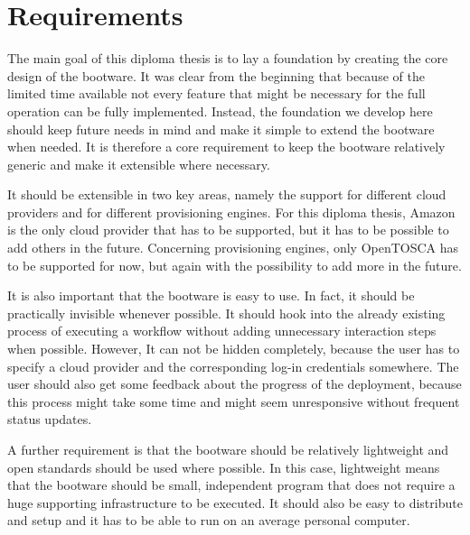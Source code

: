 \section{Requirements}

The main goal of this diploma thesis is to lay a foundation by creating the core design of the bootware.
It was clear from the beginning that because of the limited time available not every feature that might be necessary for the full operation can be fully implemented.
Instead, the foundation we develop here should keep future needs in mind and make it simple to extend the bootware when needed.
It is therefore a core requirement to keep the bootware relatively generic and make it extensible where necessary.

It should be extensible in two key areas, namely the support for different cloud providers and for different provisioning engines.
For this diploma thesis, Amazon is the only cloud provider that has to be supported, but it has to be possible to add others in the future.
Concerning provisioning engines, only OpenTOSCA has to be supported for now, but again with the possibility to add more in the future.

It is also important that the bootware is easy to use.
In fact, it should be practically invisible whenever possible.
It should hook into the already existing process of executing a workflow without adding unnecessary interaction steps when possible.
However, It can not be hidden completely, because the user has to specify a cloud provider and the corresponding log-in credentials somewhere.
The user should also get some feedback about the progress of the deployment, because this process might take some time and might seem unresponsive without frequent status updates.

A further requirement is that the bootware should be relatively lightweight and open standards should be used where possible.
In this case, lightweight means that the bootware should be small, independent program that does not require a huge supporting infrastructure to be executed.
It should also be easy to distribute and setup and it has to be able to run on an average personal computer.
